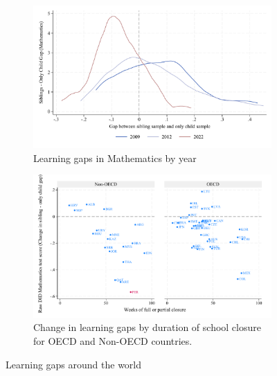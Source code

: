 


\begin{figure}[htbp]
    \centering
    
    \begin{subfigure}{\textwidth}
        \centering
        \includegraphics[width=\textwidth]{./FIGURES/Descriptive/PISA_gap_PV1MATH_histogram_2009_2022.pdf}
        \caption{Learning gaps in Mathematics by year}
        \label{fig:1a}
    \end{subfigure}
    
    \vspace{1em} %
    
    \begin{subfigure}{\textwidth}
        \centering
        \includegraphics[width=\textwidth]{./FIGURES/Descriptive/PISA_raw_DID_PV1MATH_not_fully_open.pdf}
        \caption{Change in learning gaps by duration of school closure for OECD and Non-OECD countries.}
        \label{fig:1b}
    \end{subfigure}
    
    \caption{Learning gaps around the world}
    \label{fig:pisa}
\end{figure}


